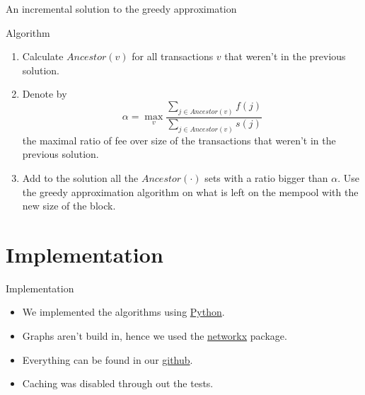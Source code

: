 \documentclass{beamer}
\begin{document}
\begin{frame}{An incremental solution to the greedy approximation} %
    \begin{block}{Algorithm}
        \begin{enumerate}
            \item {Calculate $Ancestor(v)$ for all transactions $v$ that 
            weren't in the previous solution.}
            \item {Denote by $$ \alpha = \max_{v} \frac{\sum_{j\in Ancestor(v)}
             f(j)}{\sum_{j\in Ancestor(v)} s(j)} $$ the maximal ratio of fee 
             over size of the transactions that weren't in the previous 
             solution.}
            \item {Add to the solution all the $Ancestor(\cdot)$ sets with a 
            ratio bigger than $\alpha$. Use the greedy approximation 
            algorithm on what is left on the mempool with the new size of 
            the block.}
        \end{enumerate}
    \end{block}
\end{frame}

\section {Implementation}

\begin{frame}{Implementation}
    \begin{itemize}
        \item {We implemented the algorithms using 
        \href{https://www.python.org/}{Python}.}
        \item {Graphs aren't build in, hence we used the 
        \href{https://networkx.github.io/}{networkx} package.}
        \item {Everything can be found in our 
        \href{https://besartdollma.github.io/Increasing-profit-from-fees-of-cryptocurrencies/}{github}.}
        \item {Caching was disabled through out the tests.}
    \end{itemize}
\end{frame}

\end{document}
